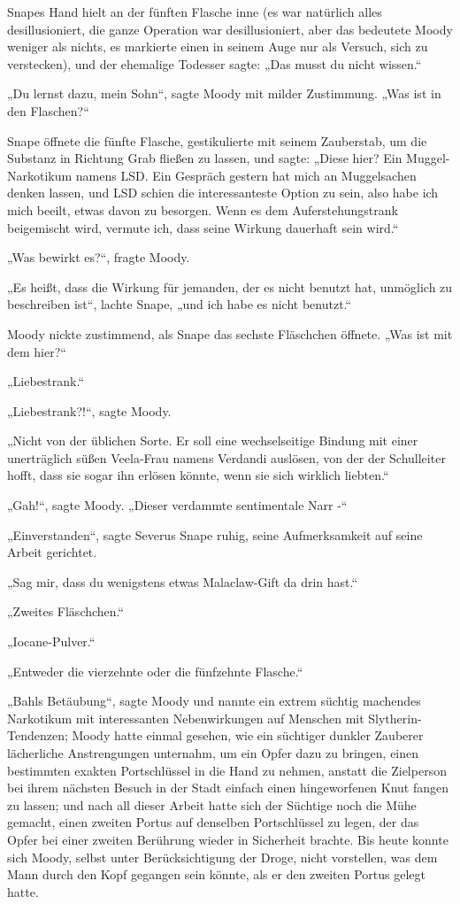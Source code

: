 {Snapes Hand hielt an der fünften Flasche inne (es war natürlich alles desillusioniert, die ganze Operation war desillusioniert, aber das bedeutete Moody weniger als nichts, es markierte einen in seinem Auge nur als Versuch, sich zu verstecken), und der ehemalige Todesser sagte: „Das musst du nicht wissen.“

„Du lernst dazu, mein Sohn“, sagte Moody mit milder Zustimmung. „Was ist in den Flaschen?“

Snape öffnete die fünfte Flasche, gestikulierte mit seinem Zauberstab, um die Substanz in Richtung Grab fließen zu lassen, und sagte: „Diese hier? Ein Muggel-Narkotikum namens LSD. Ein Gespräch gestern hat mich an Muggelsachen denken lassen, und LSD schien die interessanteste Option zu sein, also habe ich mich beeilt, etwas davon zu besorgen. Wenn es dem Auferstehungstrank beigemischt wird, vermute ich, dass seine Wirkung dauerhaft sein wird.“

„Was bewirkt es?“, fragte Moody.

„Es heißt, dass die Wirkung für jemanden, der es nicht benutzt hat, unmöglich zu beschreiben ist“, lachte Snape, „und ich habe es nicht benutzt.“

Moody nickte zustimmend, als Snape das sechste Fläschchen öffnete. „Was ist mit dem hier?“

„Liebestrank.“

„Liebestrank?!“, sagte Moody.

„Nicht von der üblichen Sorte. Er soll eine wechselseitige Bindung mit einer unerträglich süßen Veela-Frau namens Verdandi auslösen, von der der Schulleiter hofft, dass sie sogar ihn erlösen könnte, wenn sie sich wirklich liebten.“

„Gah!“, sagte Moody. „Dieser verdammte sentimentale Narr -“

„Einverstanden“, sagte Severus Snape ruhig, seine Aufmerksamkeit auf seine Arbeit gerichtet.

„Sag mir, dass du wenigstens etwas Malaclaw-Gift da drin hast.“

„Zweites Fläschchen.“

„Iocane-Pulver.“

„Entweder die vierzehnte oder die fünfzehnte Flasche.“

„Bahls Betäubung“, sagte Moody und nannte ein extrem süchtig machendes Narkotikum mit interessanten Nebenwirkungen auf Menschen mit Slytherin-Tendenzen; Moody hatte einmal gesehen, wie ein süchtiger dunkler Zauberer lächerliche Anstrengungen unternahm, um ein Opfer dazu zu bringen, einen bestimmten exakten Portschlüssel in die Hand zu nehmen, anstatt die Zielperson bei ihrem nächsten Besuch in der Stadt einfach einen hingeworfenen Knut fangen zu lassen; und nach all dieser Arbeit hatte sich der Süchtige noch die Mühe gemacht, einen zweiten Portus auf denselben Portschlüssel zu legen, der das Opfer bei einer zweiten Berührung wieder in Sicherheit brachte. Bis heute konnte sich Moody, selbst unter Berücksichtigung der Droge, nicht vorstellen, was dem Mann durch den Kopf gegangen sein könnte, als er den zweiten Portus gelegt hatte.

}
